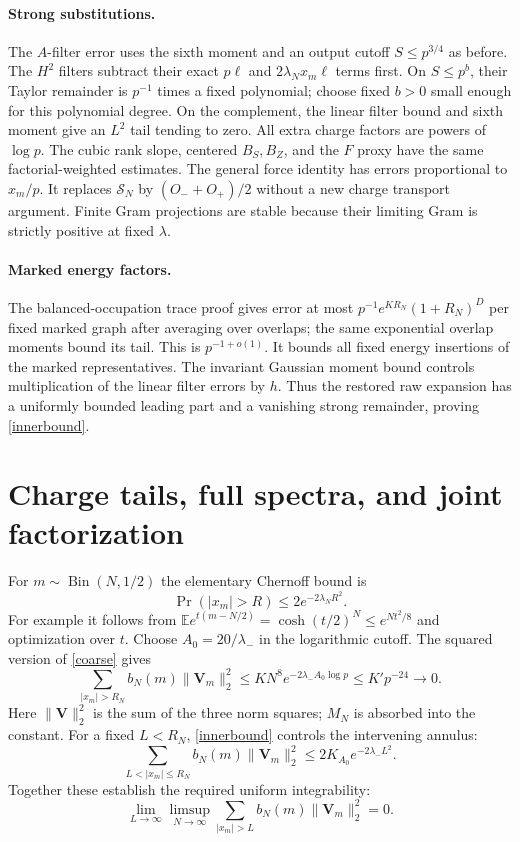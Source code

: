 \documentclass[11pt,a4paper]{article}
\newcommand{\EE}{\mathbb E}
\begin{document}
\paragraph{Strong substitutions.}
The $A$-filter error uses the sixth moment and an output cutoff
$S\le p^{3/4}$ as before. The $H^2$ filters subtract their exact
$p\ell$ and $2\lambda_Nx_m\ell$ terms first. On $S\le p^b$,
their Taylor remainder is $p^{-1}$ times a fixed polynomial;
choose fixed $b>0$ small enough for this polynomial degree.
On the complement, the linear filter bound and sixth moment
give an $L^2$ tail tending to zero. All extra charge factors are
powers of $\log p$. The cubic rank slope, centered $B_S,B_Z$,
and the $F$ proxy have the same factorial-weighted estimates.
The general force identity has errors proportional to $x_m/p$.
It replaces $\mathcal S_N$ by $(O_-+O_+)/2$ without a new
charge transport argument. Finite Gram projections are stable
because their limiting Gram is strictly positive at fixed $\lambda$.

\paragraph{Marked energy factors.}
The balanced-occupation trace proof gives error at most
$p^{-1}e^{K R_N}(1+R_N)^D$ per fixed marked graph after averaging
over overlaps; the same exponential overlap moments bound its tail.
This is $p^{-1+o(1)}$. It bounds all fixed energy insertions of
the marked representatives. The invariant Gaussian moment bound
controls multiplication of the linear filter errors by $h$.
Thus the restored raw expansion has a uniformly bounded leading
part and a vanishing strong remainder, proving \eqref{innerbound}.

\newpage
\section{Charge tails, full spectra, and joint factorization}
For $m\sim\operatorname{Bin}(N,1/2)$ the elementary Chernoff bound is
\begin{equation}
 \Pr(|x_m|>R)\le2e^{-2\lambda_N R^2}.
\end{equation}
For example it follows from
$\EE e^{t(m-N/2)}=\cosh(t/2)^N\le e^{Nt^2/8}$ and optimization
over $t$. Choose $A_0=20/\lambda_-$ in the logarithmic cutoff.
The squared version of \eqref{coarse} gives
\begin{equation}
 \sum_{|x_m|>R_N}b_N(m)\|\mathbf V_m\|_2^2
 \le K N^8e^{-2\lambda_-A_0\log p}
 \le K'p^{-24}\longrightarrow0.\label{outer}
\end{equation}
Here $\|\mathbf V\|_2^2$ is the sum of the three norm squares;
$M_N$ is absorbed into the constant. For a fixed $L<R_N$,
\eqref{innerbound} controls the intervening annulus:
\begin{equation}
 \sum_{L<|x_m|\le R_N}b_N(m)\|\mathbf V_m\|_2^2
 \le2K_{A_0}e^{-2\lambda_-L^2}.
\end{equation}
Together these establish the required uniform integrability:
\begin{equation}
 \lim_{L\to\infty}\limsup_{N\to\infty}
 \sum_{|x_m|>L}b_N(m)\|\mathbf V_m\|_2^2=0.\label{UI}
\end{equation}
\end{document}
